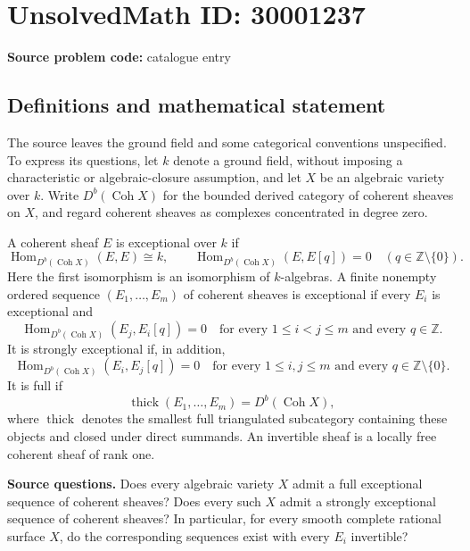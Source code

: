 \documentclass[11pt]{article}
\newcommand{\Z}{\mathbb{Z}}
\begin{document}
\section*{UnsolvedMath ID: 30001237}
\textbf{Source problem code:} catalogue entry
\subsection{Definitions and mathematical statement}
The source leaves the ground field and some categorical conventions unspecified. To express its questions, let \(k\) denote a ground field, without imposing a characteristic or algebraic-closure assumption, and let \(X\) be an algebraic variety over \(k\). Write \(D^b(\operatorname{Coh}X)\) for the bounded derived category of coherent sheaves on \(X\), and regard coherent sheaves as complexes concentrated in degree zero.

A coherent sheaf \(E\) is exceptional over \(k\) if
\[
\operatorname{Hom}_{D^b(\operatorname{Coh}X)}(E,E)\cong k,
\qquad
\operatorname{Hom}_{D^b(\operatorname{Coh}X)}(E,E[q])=0
\quad(q\in\Z\setminus\{0\}).
\]
Here the first isomorphism is an isomorphism of \(k\)-algebras. A finite nonempty ordered sequence \((E_1,\ldots,E_m)\) of coherent sheaves is exceptional if every \(E_i\) is exceptional and
\[
\operatorname{Hom}_{D^b(\operatorname{Coh}X)}(E_j,E_i[q])=0
\quad\text{for every }1\leq i<j\leq m\text{ and every }q\in\Z.
\]
It is strongly exceptional if, in addition,
\[
\operatorname{Hom}_{D^b(\operatorname{Coh}X)}(E_i,E_j[q])=0
\quad\text{for every }1\leq i,j\leq m\text{ and every }q\in\Z\setminus\{0\}.
\]
It is full if
\[
\operatorname{thick}(E_1,\ldots,E_m)=D^b(\operatorname{Coh}X),
\]
where \(\operatorname{thick}\) denotes the smallest full triangulated subcategory containing these objects and closed under direct summands. An invertible sheaf is a locally free coherent sheaf of rank one.

\textbf{Source questions.} Does every algebraic variety \(X\) admit a full exceptional sequence of coherent sheaves? Does every such \(X\) admit a strongly exceptional sequence of coherent sheaves? In particular, for every smooth complete rational surface \(X\), do the corresponding sequences exist with every \(E_i\) invertible?
\end{document}
